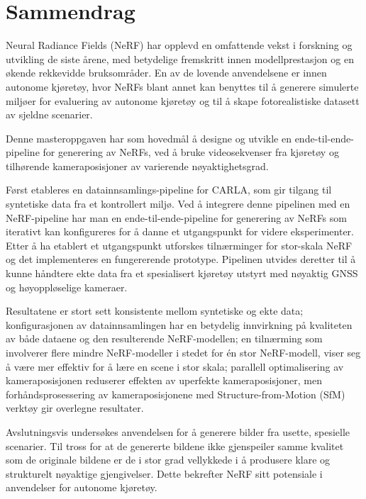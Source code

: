 \chapter*{Sammendrag}

Neural Radiance Fields (NeRF) har opplevd en omfattende vekst i forskning og utvikling de siste årene, med betydelige fremskritt innen modellprestasjon og en økende rekkevidde bruksområder. En av de lovende anvendelsene er innen autonome kjøretøy, hvor NeRFs blant annet kan benyttes til å generere simulerte miljøer for evaluering av autonome kjøretøy og til å skape fotorealistiske datasett av sjeldne scenarier.

Denne masteroppgaven har som hovedmål å designe og utvikle en ende-til-ende-pipeline for generering av NeRFs, ved å bruke videosekvenser fra kjøretøy og tilhørende kameraposisjoner av varierende nøyaktighetsgrad. 

Først etableres en datainnsamlings-pipeline for CARLA, som gir tilgang til syntetiske data fra et kontrollert miljø. Ved å integrere denne pipelinen med en NeRF-pipeline har man en ende-til-ende-pipeline for generering av NeRFs som iterativt kan konfigureres for å danne et utgangspunkt for videre eksperimenter. Etter å ha etablert et utgangspunkt utforskes tilnærminger for stor-skala NeRF og det implementeres en fungererende prototype. Pipelinen utvides deretter til å kunne håndtere ekte data fra et spesialisert kjøretøy utstyrt med nøyaktig GNSS og høyoppløselige kameraer.

Resultatene er stort sett konsistente mellom syntetiske og ekte data; konfigurasjonen av datainnsamlingen har en betydelig innvirkning på kvaliteten av både dataene og den resulterende NeRF-modellen; en tilnærming som involverer flere mindre NeRF-modeller i stedet for én stor NeRF-modell, viser seg å være mer effektiv for å lære en scene i stor skala; parallell optimalisering av kameraposisjonen reduserer effekten av uperfekte kameraposisjoner, men forhåndsprosessering av kameraposisjonene med Structure-from-Motion (SfM) verktøy gir overlegne resultater.

Avslutningsvis undersøkes anvendelsen for å generere bilder fra usette, spesielle scenarier. Til tross for at de genererte bildene ikke gjenspeiler samme kvalitet som de originale bildene er de i stor grad vellykkede i å produsere klare og strukturelt nøyaktige gjengivelser. Dette bekrefter NeRF sitt potensiale i anvendelser for autonome kjøretøy.




